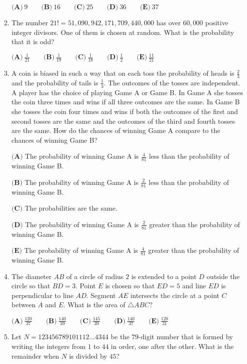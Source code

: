 \documentclass{article}
\begin{document}
\begin{enumerate}[label=\arabic*., itemsep=0.5em]
$\textbf{(A)}\ 9\qquad\textbf{(B)}\ 16\qquad\textbf{(C)}\ 25\qquad\textbf{(D)}\ 36\qquad\textbf{(E)}\ 37$\par \vspace{0.5em}\item The number $21!=51,090,942,171,709,440,000$ has over $60,000$ positive integer divisors. One of them is chosen at random. What is the probability that it is odd?

$\textbf{(A)}\ \frac{1}{21} \qquad \textbf{(B)}\ \frac{1}{19} \qquad \textbf{(C)}\ \frac{1}{18} \qquad \textbf{(D)}\ \frac{1}{2} \qquad \textbf{(E)}\ \frac{11}{21}$\par \vspace{0.5em}\item A coin is biased in such a way that on each toss the probability of heads is $\frac{2}{3}$ and the probability of tails is $\frac{1}{3}$. The outcomes of the tosses are independent. A player has the choice of playing Game A or Game B. In Game A she tosses the coin three times and wins if all three outcomes are the same. In Game B she tosses the coin four times and wins if both the outcomes of the first and second tosses are the same and the outcomes of the third and fourth tosses are the same. How do the chances of winning Game A compare to the chances of winning Game B?

$\textbf{(A)}$ The probability of winning Game A is $\frac{4}{81}$ less than the probability of winning Game B.

$\textbf{(B)}$ The probability of winning Game A is $\frac{2}{81}$ less than the probability of winning Game B.

$\textbf{(C)}$ The probabilities are the same.

$\textbf{(D)}$ The probability of winning Game A is $\frac{2}{81}$ greater than the probability of winning Game B.

$\textbf{(E)}$ The probability of winning Game A is $\frac{4}{81}$ greater than the probability of winning Game B.\par \vspace{0.5em}\item The diameter $AB$ of a circle of radius $2$ is extended to a point $D$ outside the circle so that $BD=3$. Point $E$ is chosen so that $ED=5$ and line $ED$ is perpendicular to line $AD$. Segment $AE$ intersects the circle at a point $C$ between $A$ and $E$. What is the area of $\triangle 
ABC$?

$\textbf{(A)}\ \frac{120}{37}\qquad\textbf{(B)}\ \frac{140}{39}\qquad\textbf{(C)}\ \frac{145}{39}\qquad\textbf{(D)}\ \frac{140}{37}\qquad\textbf{(E)}\ \frac{120}{31}$\par \vspace{0.5em}\item Let $N=123456789101112\dots4344$ be the $79$-digit number that is formed by writing the integers from $1$ to $44$ in order, one after the other. What is the remainder when $N$ is divided by $45$?


\end{enumerate}
\end{document}
